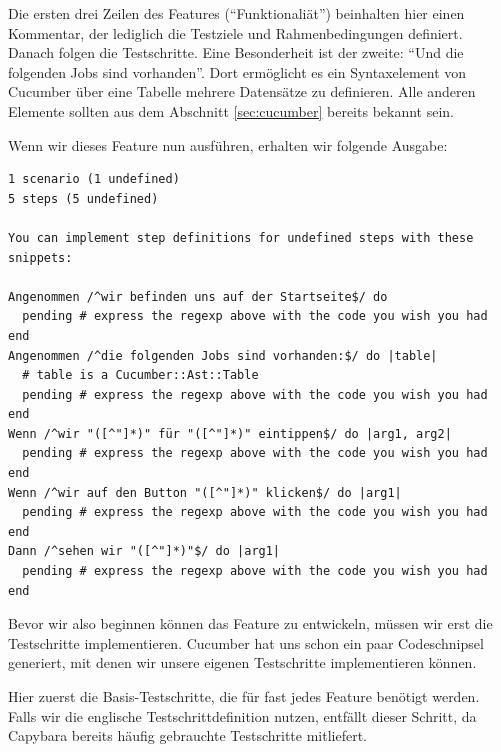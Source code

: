 Die ersten drei Zeilen des Features ("`Funktionaliät"') beinhalten hier einen Kommentar, der lediglich die Testziele und Rahmenbedingungen definiert. Danach folgen die Testschritte. Eine Besonderheit ist der zweite: "`Und die folgenden Jobs sind vorhanden"'. Dort ermöglicht es ein Syntaxelement von Cucumber über eine Tabelle mehrere Datensätze zu definieren. Alle anderen Elemente sollten aus dem Abschnitt \ref{sec:cucumber} bereits bekannt sein.

Wenn wir dieses Feature nun ausführen, erhalten wir folgende Ausgabe:

\begin{lstlisting}
1 scenario (1 undefined)
5 steps (5 undefined)

You can implement step definitions for undefined steps with these snippets:

Angenommen /^wir befinden uns auf der Startseite$/ do
  pending # express the regexp above with the code you wish you had
end
Angenommen /^die folgenden Jobs sind vorhanden:$/ do |table|
  # table is a Cucumber::Ast::Table
  pending # express the regexp above with the code you wish you had
end
Wenn /^wir "([^"]*)" für "([^"]*)" eintippen$/ do |arg1, arg2|
  pending # express the regexp above with the code you wish you had
end
Wenn /^wir auf den Button "([^"]*)" klicken$/ do |arg1|
  pending # express the regexp above with the code you wish you had
end
Dann /^sehen wir "([^"]*)"$/ do |arg1|
  pending # express the regexp above with the code you wish you had
end
\end{lstlisting}




Bevor wir also beginnen können das Feature zu entwickeln, müssen wir erst die Testschritte implementieren. Cucumber hat uns schon ein paar Codeschnipsel generiert, mit denen wir unsere eigenen Testschritte implementieren können. 

Hier zuerst die Basis-Testschritte, die für fast jedes Feature benötigt werden. Falls wir die englische Testschrittdefinition nutzen, entfällt dieser Schritt, da Capybara bereits häufig gebrauchte Testschritte mitliefert.


